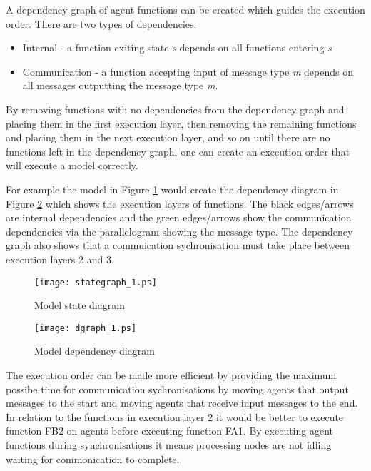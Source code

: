 \documentclass{aamas2009}
\begin{document}

A dependency graph of agent functions can be created which guides the execution
order. There are two types of dependencies:

\begin{itemize}
  \item Internal - a function exiting state \textit{s} depends on all functions
  entering \textit{s}
  \item Communication - a function accepting input of message type \textit{m}
  depends on all messages outputting the message type \textit{m}.
\end{itemize}

By removing functions with no dependencies from the dependency graph and placing
them in the first execution layer, then removing the remaining functions and
placing them in the next execution layer, and so on until there are no
functions left in the dependency graph, one can create an execution order that
will execute a model correctly.

For example the model in Figure \ref{fig:stategraph_1} would create the
dependency diagram in Figure \ref{fig:dgraph_1} which shows the execution
layers of functions. The black edges/arrows are internal dependencies and the
green edges/arrows show the communication dependencies via the parallelogram
showing the message type. The dependency graph also shows that a commuication
sychronisation must take place between execution layers 2 and 3.

\begin{figure}[hbp]
\centering
\texttt{[image: stategraph\_1.ps]}
\caption{Model state diagram}
\label{fig:stategraph_1}
\end{figure}

\begin{figure}[hbp]
\centering
\texttt{[image: dgraph\_1.ps]}
\caption{Model dependency diagram}
\label{fig:dgraph_1}
\end{figure}

The execution order can be made more efficient by providing the maximum possibe
time for communication sychronisations by moving agents that output messages to
the start and moving agents that receive input messages to the end. In relation
to the functions in execution layer 2 it would be better to execute function FB2
on agents before executing function FA1. By executing agent functions during
synchronisations it means processing nodes are not idling waiting for
commonication to complete.
\end{document}
